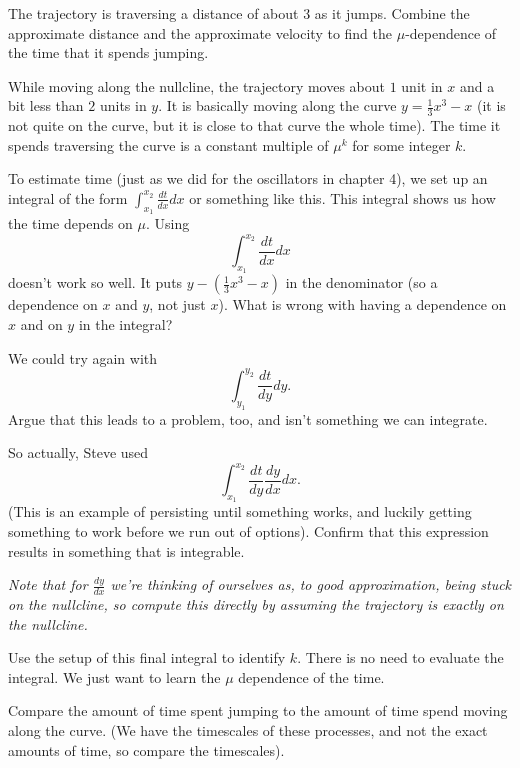 \documentclass[12pt,letterpaper,noanswers]{exam}
\begin{document}
\begin{questions}
\begin{parts}
\item The trajectory is traversing a
distance of about $3$ as it jumps.  Combine the approximate distance and the approximate velocity to find the $\mu$-dependence of the time that it spends jumping.
\item While moving along the nullcline, the trajectory moves about $1$ unit in $x$ and a bit less than $2$ units in $y$.  It is basically moving along the curve
$y = \frac{1}{3}x^3-x$ (it is not quite on the curve, but it is close to that curve the whole time).  The time it spends 
traversing the curve is a constant multiple of $\mu^k$ for some integer $k$.  


To estimate time (just as we did for the oscillators in chapter 4), we set up an integral of the form $\displaystyle\int_{x_1}^{x_2} \frac{dt}{dx}dx$
or something like this.  This integral shows us how the time depends on $\mu$.  Using  \[\int_{x_1}^{x_2} \frac{dt}{dx}dx\]
doesn't work so well.  It
puts $y-(\frac{1}{3}x^3-x)$ in the denominator (so a dependence on $x$ and $y$, not just $x$).
What is wrong with having a dependence on $x$ and on $y$ in the integral?

\item We could try again with \[\int_{y_1}^{y_2} \frac{dt}{dy}dy.\]  Argue that this leads to a problem, too, and isn't something we can integrate.

\item 
So actually, Steve used \[\int_{x_1}^{x_2} \frac{dt}{dy}\frac{dy}{dx}dx.\]  
(This is an example of persisting until something works, and luckily getting something to work before we run out of options).  Confirm that this expression results in something that is integrable.

\emph{Note that for $\frac{dy}{dx}$ we're thinking of ourselves as, to good approximation, being
stuck on the nullcline, so compute this directly by assuming the trajectory is exactly on the nullcline.}

\item
Use the setup of this final integral to identify $k$.  There is no need to evaluate the integral.  We just want to learn the $\mu$ dependence of the time.  
\item Compare the amount of time spent jumping to the amount of time spend moving along the curve.  (We have the timescales
of these processes, and not the exact amounts of time, so compare the timescales).
\end{parts}



\end{questions}
\end{document}
